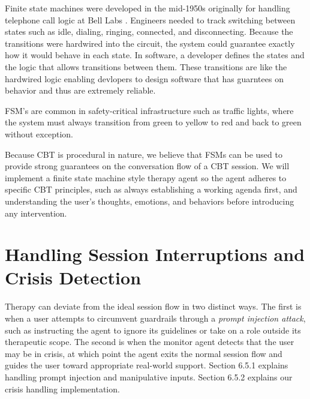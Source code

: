 \documentclass[twoside]{report}
\begin{document}
Finite state machines were developed in the mid-1950s originally for handling telephone call logic at Bell Labs \cite{mealy1955method}. Engineers needed to track switching between states such as idle, dialing, ringing, connected, and disconnecting. Because the transitions were hardwired into the circuit, the system could guarantee exactly how it would behave in each state. In software, a developer defines the states and the logic that allows transitions between them. These transitions are like the hardwired logic enabling devlopers to design software that has guarntees on behavior and thus are extremely reliable. 

FSM's are common in safety-critical infrastructure such as traffic lights, where the system must always transition from green to yellow to red and back to green without exception.

Because CBT is procedural in nature, we believe that FSMs can be used to provide strong guarantees on the conversation flow of a CBT session. We will implement a finite state machine style therapy agent so the agent adheres to specific CBT principles, such as always establishing a working agenda first, and understanding the user's thoughts, emotions, and behaviors before introducing any intervention.

\section{Handling Session Interruptions and Crisis Detection}
Therapy can deviate from the ideal session flow in two distinct ways. The first is when a user attempts to circumvent guardrails through a \emph{prompt injection attack}, such as instructing the agent to ignore its guidelines or take on a role outside its therapeutic scope. The second is when the monitor agent detects that the user may be in crisis, at which point the agent exits the normal session flow and guides the user toward appropriate real-world support. Section 6.5.1 explains handling prompt injection and manipulative inputs. Section 6.5.2 explains our crisis handling implementation.
\end{document}
